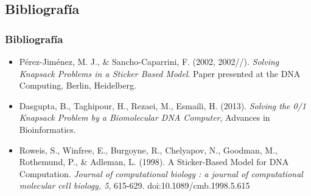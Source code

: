 \documentclass[12pt]{beamer}
\begin{document}
 \begin{frame}
     \section{Bibliografía}
     \frametitle{Bibliografía}
    \begin{itemize}
        \item Pérez-Jiménez, M. J., \& Sancho-Caparrini, F. (2002, 2002//). \emph{Solving Knapsack Problems in a Sticker Based Model}. Paper presented at the DNA Computing, Berlin, Heidelberg.
        \item Dasgupta, B., Taghipour, H., Rezaei, M., Esmaili, H. (2013). \emph{Solving the 0/1 Knapsack Problem by a Biomolecular DNA Computer}, Advances in Bioinformatics.
        \item Roweis, S., Winfree, E., Burgoyne, R., Chelyapov, N., Goodman, M., Rothemund, P., \& Adleman, L. (1998). A Sticker-Based Model for DNA Computation. \emph{Journal of computational biology : a journal of computational molecular cell biology, 5}, 615-629. doi:10.1089/cmb.1998.5.615
    \end{itemize}
 \end{frame}
\end{document}
